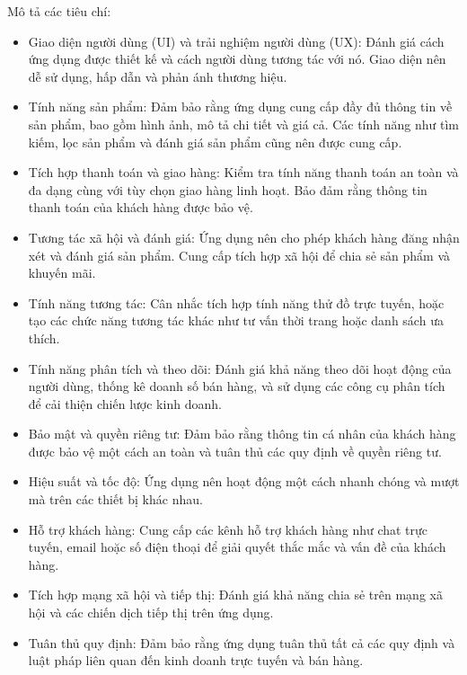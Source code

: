 Mô tả các tiêu chí:
\begin{itemize}
    \item Giao diện người dùng (UI) và trải nghiệm người dùng (UX): Đánh giá cách ứng dụng được thiết kế và cách người dùng tương tác với nó. Giao diện nên dễ sử dụng, hấp dẫn và phản ánh thương hiệu.

 \item Tính năng sản phẩm: Đảm bảo rằng ứng dụng cung cấp đầy đủ thông tin về sản phẩm, bao gồm hình ảnh, mô tả chi tiết và giá cả. Các tính năng như tìm kiếm, lọc sản phẩm và đánh giá sản phẩm cũng nên được cung cấp.

\item Tích hợp thanh toán và giao hàng: Kiểm tra tính năng thanh toán an toàn và đa dạng cùng với tùy chọn giao hàng linh hoạt. Bảo đảm rằng thông tin thanh toán của khách hàng được bảo vệ.

\item Tương tác xã hội và đánh giá: Ứng dụng nên cho phép khách hàng đăng nhận xét và đánh giá sản phẩm. Cung cấp tích hợp xã hội để chia sẻ sản phẩm và khuyến mãi.

\item Tính năng tương tác: Cân nhắc tích hợp tính năng thử đồ trực tuyến, hoặc tạo các chức năng tương tác khác như tư vấn thời trang hoặc danh sách ưa thích.

\item Tính năng phân tích và theo dõi: Đánh giá khả năng theo dõi hoạt động của người dùng, thống kê doanh số bán hàng, và sử dụng các công cụ phân tích để cải thiện chiến lược kinh doanh.

\item Bảo mật và quyền riêng tư: Đảm bảo rằng thông tin cá nhân của khách hàng được bảo vệ một cách an toàn và tuân thủ các quy định về quyền riêng tư.

\item Hiệu suất và tốc độ: Ứng dụng nên hoạt động một cách nhanh chóng và mượt mà trên các thiết bị khác nhau.

\item Hỗ trợ khách hàng: Cung cấp các kênh hỗ trợ khách hàng như chat trực tuyến, email hoặc số điện thoại để giải quyết thắc mắc và vấn đề của khách hàng.

\item Tích hợp mạng xã hội và tiếp thị: Đánh giá khả năng chia sẻ trên mạng xã hội và các chiến dịch tiếp thị trên ứng dụng.

\item Tuân thủ quy định: Đảm bảo rằng ứng dụng tuân thủ tất cả các quy định và luật pháp liên quan đến kinh doanh trực tuyến và bán hàng.
\end{itemize}

